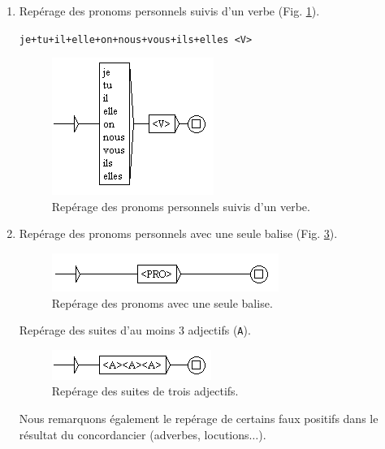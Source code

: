 \documentclass[xcolor={table,usenames,dvipsnames}]{article}
\begin{document}
\begin{enumerate}
	\item 
	Repérage des pronoms personnels suivis d'un verbe (Fig. \ref{fig:jetuil}).
	
	\texttt{je+tu+il+elle+on+nous+vous+ils+elles <V>}
	
			\begin{figure}[H] %
		\centering
		\includegraphics[width=.3\linewidth]{img/jetuil.png}
		\caption{Repérage des pronoms personnels suivis d'un verbe.}
		\label{fig:jetuil}
	\end{figure}
	
	\item Repérage des pronoms personnels avec une seule balise (Fig. \ref{fig:jetuil_balise}).
		\begin{figure}[H] %
		\centering
		\includegraphics[width=1\linewidth]{img/pronom.png}
		\caption{Repérage des pronoms avec une seule balise.}
		\label{fig:jetuil_balise}
	\end{figure}
	
	Repérage des suites d'au moins 3 adjectifs (\texttt{A}).
			\begin{figure}[H] %
		\centering
		\includegraphics[width=.7\linewidth]{img/adjectifs.png}
		\caption{Repérage des suites de trois adjectifs.}
		\label{fig:jetuil_balise}
	\end{figure}
	
	Nous remarquons également le repérage de certains faux positifs dans le résultat du concordancier (adverbes, locutions$\dots$).
	

\end{enumerate}
\end{document}
